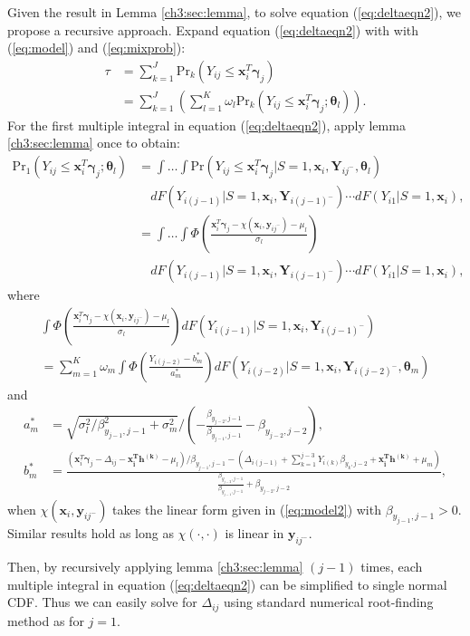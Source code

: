 \documentclass[useAMS,usenatbib,referee]{biom}
\newcommand{\prob}{\mbox{Pr}}
\begin{document}
\begin{itemize}
  Given the result in Lemma \ref{ch3:sec:lemma}, to solve equation
  (\ref{eq:deltaeqn2}), we propose a recursive approach.
Expand equation (\ref{eq:deltaeqn2}) with with (\ref{eq:model}) and (\ref{eq:mixprob}):
\begin{align*}
\tau & = \sum_{k = 1}^J\prob_k (Y_{ij} \leq \bm x_{i}^T \bm \gamma_j) \\
& = \sum_{k = 1}^J \left( \sum_{l = 1}^K \omega_{l} \prob_k (Y_{ij} \leq \bm x_{i}^T \bm \gamma_j; \bm \theta_l) \right).
\end{align*}
For the first
  multiple integral in equation (\ref{eq:deltaeqn2}), apply lemma
  \ref{ch3:sec:lemma} once to obtain:
  \begin{align*}
    \prob_1 (Y_{ij} \leq \bm x_{i}^T \bm \gamma_j; \bm \theta_l) & =
    \int\dots\int
    \prob (Y_{ij} \leq \bm x_{i}^T\bm \gamma_j | S=1, \bm x_{i}, \bm Y_{ij^{-}}, \bm \theta_l)\\
    & \quad  dF(Y_{i(j-1)}|S=1, \bm x_{i}, \bm Y_{i(j-1)^{-}}) \cdots d F (Y_{i1} | S = 1, \bm x_{i}), \\
    & = \int\dots\int \Phi \left( \frac{\bm x_{i}^T \bm \gamma_j - \chi(\bm x_{i}, \bm y_{ij^{-}}) - \mu_l}{\sigma_{l}} \right) \\
    & \quad   dF(Y_{i(j-1)}|S=1, \bm x_{i}, \bm Y_{i(j-1)^{-}}) \cdots d F (Y_{i1} | S = 1, \bm x_{i}),
\end{align*}
where
\begin{multline*}
\int \Phi \left( \frac{\bm x_{i}^T \bm \gamma_j - \chi(\bm x_{i}, \bm y_{ij^{-}}) - \mu_l}{\sigma_{l}}\right) dF(Y_{i(j-1)}|S=1, \bm x_{i}, \bm Y_{i(j-1)^{-}})  \\
 =  \sum_{m = 1}^K \omega_m\int \Phi \left( \frac{Y_{i(j-2)} - b_m^{*}}{a_m^{*}} \right) dF(Y_{i(j-2)}|S=1, \bm x_{i}, \bm Y_{i(j-2)^{-}}, \bm \theta_m)
\end{multline*}
and
\begin{align*}
a_m^{*} & = \sqrt{\sigma_l^2/\beta_{y_{j-1}, j-1}^2 + \sigma_{m}^2} \big / \left( - \frac{\beta_{y_{j-2}, j-1}}{\beta_{y_{j-1}, j-1}} - \beta_{y_{j-2}, j-2} \right), \\
b_m^{*} & = \frac{ (\bm x_i^T \bm \gamma_j - \Delta_{ij} - \bm{x_i^T h^{(k)}} - \mu_l)/\beta_{y_{j-1}, j-1} - (\Delta_{i(j-1)} + \sum_{k=1}^{j-3} Y_{i(k)} \beta_{y_k, j-2} + \bm{x_{i}^{T}h^{(k)}} + \mu_m)}{\frac{\beta_{y_{j-2}, j-1}}{\beta_{y_{j-1}, j-1}} + \beta_{y_{j-2}, j-2}},
\end{align*}
when $\chi(\bm x_i, \bm y_{ij^{-}})$ takes the linear form given in (\ref{eq:model2}) with  $\beta_{y_{j-1}, j-1} > 0$.  Similar results hold as long as $\chi(\cdot,\cdot)$ is linear in $\bm y_{ij^{-}}$.

  Then, by recursively applying lemma \ref{ch3:sec:lemma} $(j-1)$ times,
  each multiple integral in equation (\ref{eq:deltaeqn2}) can be
  simplified to single normal CDF. Thus we can easily solve for
  $\Delta_{ij}$ using standard numerical root-finding method as for $j
  = 1$.

\end{itemize}
\end{document}
